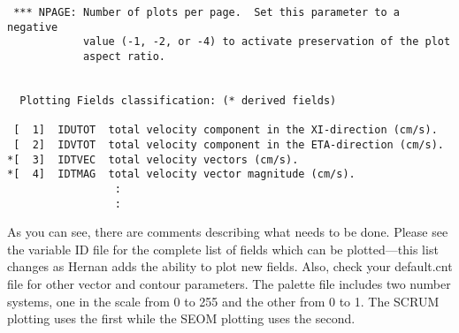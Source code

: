 \begin{verbatim}
 *** NPAGE: Number of plots per page.  Set this parameter to a negative
            value (-1, -2, or -4) to activate preservation of the plot
            aspect ratio.


  Plotting Fields classification: (* derived fields)

 [  1]  IDUTOT  total velocity component in the XI-direction (cm/s).
 [  2]  IDVTOT  total velocity component in the ETA-direction (cm/s).
*[  3]  IDTVEC  total velocity vectors (cm/s).
*[  4]  IDTMAG  total velocity vector magnitude (cm/s).
                 :
                 :
\end{verbatim}
As you can see, there are comments describing what needs to be
done.  Please see the variable ID file for the complete list of fields
which can be plotted---this list changes as Hernan adds the ability to
plot new fields. Also, check your default.cnt file for other vector and
contour parameters. The palette file includes two number systems, one
in the scale from 0 to 255 and the other from 0 to 1.
The SCRUM plotting uses the first while the SEOM plotting uses the
second.
